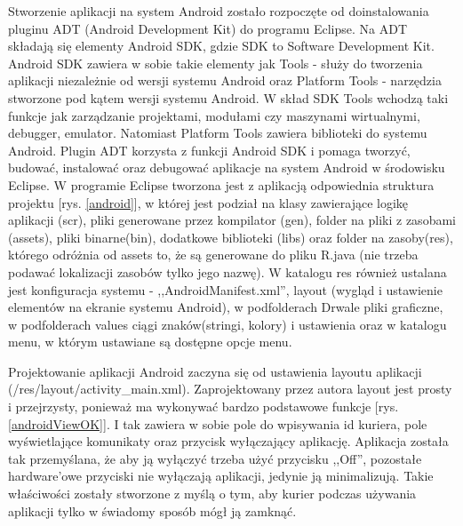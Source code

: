 \documentclass[eng,printmode,oneside]{mgr}
\begin{document}
Stworzenie aplikacji na system Android zostało rozpoczęte od doinstalowania
pluginu ADT (Android Development Kit) do programu Eclipse. Na ADT składają się
elementy Android SDK, gdzie SDK to Software Development Kit. Android SDK
zawiera w sobie takie elementy jak Tools - służy do tworzenia aplikacji niezależnie od
wersji systemu Android oraz Platform Tools - narzędzia stworzone pod kątem
wersji systemu Android. W skład SDK Tools wchodzą taki funkcje jak zarządzanie
projektami, modułami czy maszynami wirtualnymi, debugger, emulator. Natomiast
Platform Tools zawiera biblioteki do systemu Android. Plugin ADT  korzysta
z funkcji Android SDK i pomaga tworzyć, budować, instalować oraz debugować
aplikacje na system Android w środowisku Eclipse. W programie Eclipse tworzona
jest z aplikacją odpowiednia struktura projektu [rys. \ref{android}], w której
jest podział na klasy zawierające logikę aplikacji (scr), pliki generowane przez kompilator (gen),
folder na pliki z zasobami (assets), pliki binarne(bin), dodatkowe biblioteki
(libs) oraz folder na zasoby(res), którego odróżnia od assets to, że są
generowane do pliku R.java (nie trzeba podawać lokalizacji zasobów tylko jego
nazwę). W katalogu res również ustalana jest konfiguracja systemu - 
,,AndroidManifest.xml'', layout (wygląd i ustawienie elementów na ekranie
systemu Android), w podfolderach Drwale pliki graficzne, w podfolderach values
ciągi znaków(stringi, kolory) i ustawienia oraz w katalogu menu, w którym
ustawiane są dostępne opcje menu.

Projektowanie aplikacji Android zaczyna się od ustawienia layoutu aplikacji
(/res/layout/activity\_main.xml). Zaprojektowany przez autora layout jest
prosty i przejrzysty, ponieważ ma wykonywać bardzo podstawowe funkcje [rys.
\ref{androidViewOK}]. I tak zawiera w sobie pole do wpisywania id kuriera,
pole wyświetlające komunikaty oraz przycisk wyłączający aplikację. Aplikacja została
tak przemyślana, że aby ją wyłączyć trzeba użyć przycisku ,,Off'', pozostałe hardware'owe przyciski
nie wyłączają aplikacji, jedynie ją minimalizują. Takie właściwości zostały
stworzone z myślą o tym, aby kurier podczas używania aplikacji tylko w świadomy
sposób mógł ją zamknąć.
\end{document}
